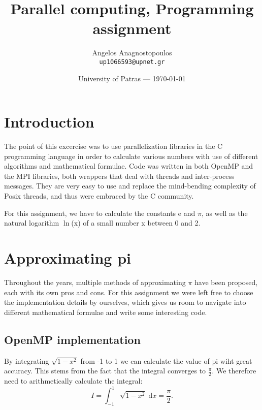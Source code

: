 \documentclass{article}
\title{Parallel computing, Programming assignment} %
\author{Angelos Anagnostopoulos\\ \texttt{up1066593@upnet.gr}} %
\date{University of Patras --- \today} %
\begin{document}
\maketitle %


\section*{Introduction} %

The point of this excercise was to use parallelization libraries in the C programming language in order to calculate various numbers with use of different algorithms and mathematical formulae. 
Code was written in both OpenMP and the MPI libraries, both wrappers that deal with threads and inter-process messages. 
They are very easy to use and replace the mind-bending complexity of Posix threads, and thus were embraced by the C community. 

For this assignment, we have to calculate the constants e and $ \pi $, as well as the natural logarithm $ \ln $(x) of a small number x between 0 and 2.


\section{Approximating pi} %

Throughout the years, multiple methods of approximating $ \pi $ have been proposed, each with its own pros and cons.
For this assignment we were left free to choose the implementation details by ourselves,
which gives us room to navigate into different mathematical formulae and write some interesting code.

\subsection{OpenMP implementation}

By integrating $ \sqrt{1-x^2}	$ from -1 to 1 we can calculate the value of pi wiht great accuracy.
This stems from the fact that the integral converges to $ \frac{\pi}{2} $. We therefore need to arithmetically calculate the integral:
\begin{equation}
	I = \int_{-1}^{1} \sqrt{1-x^2} \; \text{d}x = \frac{\pi}{2}.
\end{equation}
\end{document}
